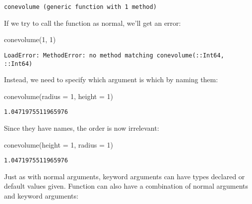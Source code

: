 \documentclass[
  letterpaper,
  DIV=11,
  numbers=noendperiod]{scrreprt}
\newenvironment{Shaded}{\begin{snugshade}}{\end{snugshade}}
\newcommand{\FloatTok}[1]{\textcolor[rgb]{0.68,0.00,0.00}{#1}}
\newcommand{\FunctionTok}[1]{\textcolor[rgb]{0.28,0.35,0.67}{#1}}
\newcommand{\KeywordTok}[1]{\textcolor[rgb]{0.00,0.23,0.31}{#1}}
\newcommand{\NormalTok}[1]{\textcolor[rgb]{0.00,0.23,0.31}{#1}}
\newcommand{\OperatorTok}[1]{\textcolor[rgb]{0.37,0.37,0.37}{#1}}
\newcommand{\SpecialCharTok}[1]{\textcolor[rgb]{0.37,0.37,0.37}{#1}}
\newcommand{\StringTok}[1]{\textcolor[rgb]{0.13,0.47,0.30}{#1}}
\begin{document}
\begin{verbatim}
conevolume (generic function with 1 method)
\end{verbatim}

If we try to call the function as normal, we'll get an error:

\begin{Shaded}
\begin{Highlighting}[]
\FunctionTok{conevolume}\NormalTok{(}\FloatTok{1}\NormalTok{, }\FloatTok{1}\NormalTok{)}
\end{Highlighting}
\end{Shaded}

\begin{verbatim}
LoadError: MethodError: no method matching conevolume(::Int64, ::Int64)
\end{verbatim}

Instead, we need to specify which argument is which by naming them:

\begin{Shaded}
\begin{Highlighting}[]
\FunctionTok{conevolume}\NormalTok{(radius }\OperatorTok{=} \FloatTok{1}\NormalTok{, height }\OperatorTok{=} \FloatTok{1}\NormalTok{)}
\end{Highlighting}
\end{Shaded}

\begin{verbatim}
1.0471975511965976
\end{verbatim}

Since they have names, the order is now irrelevant:

\begin{Shaded}
\begin{Highlighting}[]
\FunctionTok{conevolume}\NormalTok{(height }\OperatorTok{=} \FloatTok{1}\NormalTok{, radius }\OperatorTok{=} \FloatTok{1}\NormalTok{)}
\end{Highlighting}
\end{Shaded}

\begin{verbatim}
1.0471975511965976
\end{verbatim}

Just as with normal arguments, keyword arguments can have types declared
or default values given. Function can also have a combination of normal
arguments and keyword arguments:

\begin{Shaded}
\end{Shaded}
\end{document}
